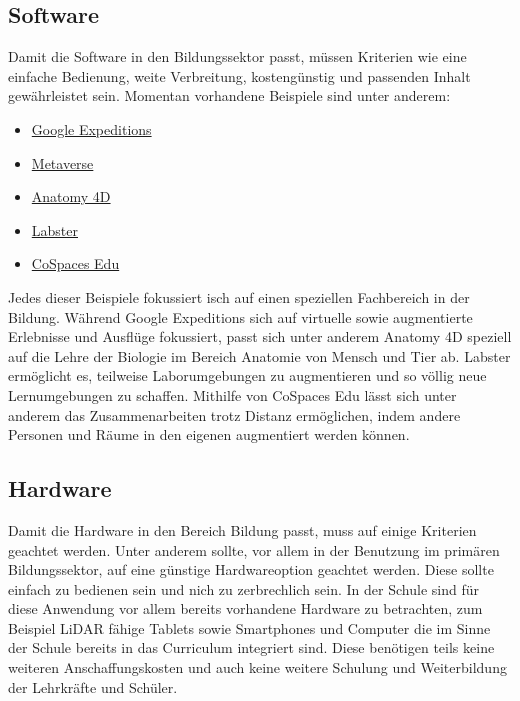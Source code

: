 \documentclass[conference]{IEEEtran}
\begin{document}
\subsection{Software}
Damit die Software in den Bildungssektor passt, müssen Kriterien wie eine einfache Bedienung,
weite Verbreitung, kostengünstig und passenden Inhalt gewährleistet sein. Momentan
vorhandene Beispiele sind unter anderem:
\begin{itemize}
    \item \href{https://sites.google.com/dublinschools.net/vr-ar/google-geo-tools/google-expeditions}{Google Expeditions}
    \item \href{https://koerber-stiftung.de/projekte/eustory/teaching-and-learning-in-the-metaverse/}{Metaverse}
    \item \href{https://www.4danatomy.com/}{Anatomy 4D}
    \item \href{https://www.labster.com/}{Labster}
    \item \href{https://www.cospaces.io/}{CoSpaces Edu}
\end{itemize}
Jedes dieser Beispiele fokussiert isch auf einen speziellen Fachbereich
in der Bildung. Während Google Expeditions sich auf virtuelle sowie augmentierte
Erlebnisse und Ausflüge fokussiert, passt sich unter anderem Anatomy 4D speziell
auf die Lehre der Biologie im Bereich Anatomie von Mensch und Tier ab. 
Labster ermöglicht es, teilweise Laborumgebungen zu augmentieren und so völlig neue
Lernumgebungen zu schaffen. Mithilfe von CoSpaces Edu lässt sich unter anderem
das Zusammenarbeiten trotz Distanz ermöglichen, indem andere Personen und Räume in 
den eigenen augmentiert werden können. \cite{w1}

\subsection{Hardware}
Damit die Hardware in den Bereich Bildung passt, muss auf einige Kriterien geachtet werden.
Unter anderem sollte, vor allem in der Benutzung im primären Bildungssektor, auf eine günstige
Hardwareoption geachtet werden. Diese sollte einfach zu bedienen sein und nich zu zerbrechlich sein.
In der Schule sind für diese Anwendung vor allem bereits vorhandene Hardware zu betrachten, zum Beispiel
LiDAR fähige Tablets sowie Smartphones und Computer die im Sinne der Schule bereits in das Curriculum
integriert sind. Diese benötigen teils keine weiteren Anschaffungskosten und auch keine weitere Schulung und
Weiterbildung der Lehrkräfte und Schüler.
\end{document}
